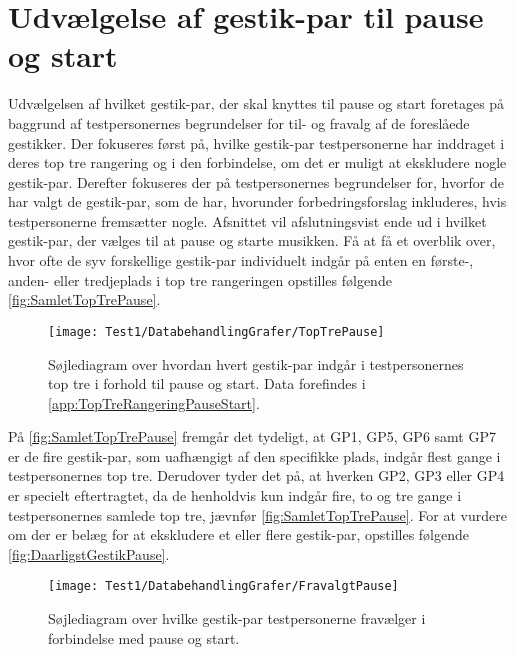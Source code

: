 \section{Udvælgelse af gestik-par til pause og start}
\label{TestresultaterPauseStart}
%
Udvælgelsen af hvilket gestik-par, der skal knyttes til pause og start foretages på baggrund af testpersonernes begrundelser for til- og fravalg af de foreslåede gestikker. Der fokuseres først på, hvilke gestik-par testpersonerne har inddraget i deres top tre rangering og i den forbindelse, om det er muligt at ekskludere nogle gestik-par. Derefter fokuseres der på testpersonernes begrundelser for, hvorfor de har valgt de gestik-par, som de har, hvorunder forbedringsforslag inkluderes, hvis testpersonerne fremsætter nogle. Afsnittet vil afslutningsvist ende ud i hvilket gestik-par, der vælges til at pause og starte musikken.\blankline
%
Få at få et overblik over, hvor ofte de syv forskellige gestik-par individuelt indgår på enten en første-, anden- eller tredjeplads i top tre rangeringen opstilles følgende \autoref{fig:SamletTopTrePause}. 
%
\begin{figure}[H]
	\centering
	\texttt{[image: Test1/DatabehandlingGrafer/TopTrePause]}
	\caption{Søjlediagram over hvordan hvert gestik-par indgår i testpersonernes top tre i forhold til pause og start. Data forefindes i \autoref{app:TopTreRangeringPauseStart}.}
	\label{fig:SamletTopTrePause}
\end{figure}
\noindent
% 
På \autoref{fig:SamletTopTrePause} fremgår det tydeligt, at GP1, GP5, GP6 samt GP7 er de fire gestik-par, som uafhængigt af den specifikke plads, indgår flest gange i testpersonernes top tre. Derudover tyder det på, at hverken GP2, GP3 eller GP4 er specielt eftertragtet, da de henholdvis kun indgår fire, to og tre gange i testpersonernes samlede top tre, jævnfør \autoref{fig:SamletTopTrePause}. For at vurdere om der er belæg for at ekskludere et eller flere gestik-par, opstilles følgende \autoref{fig:DaarligstGestikPause}.  
%
\begin{figure}[H]
	\centering
	\texttt{[image: Test1/DatabehandlingGrafer/FravalgtPause]}
	\caption{Søjlediagram over hvilke gestik-par testpersonerne fravælger i forbindelse med pause og start.}
	\label{fig:DaarligstGestikPause}
\end{figure}
\noindent
%
